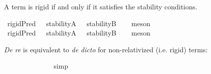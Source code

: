 \begin{isabellebody}
\begin{isamarkuptext}
A term is rigid if and only if it satisfies the stability conditions.%
\end{isamarkuptext}\isamarkuptrue%
\isamarkupfalse%
\ {\isachardoublequoteopen}{\isasymlfloor}rigidPred\ {\isacharparenleft}{\isasymtau}{\isacharcolon}{\isacharcolon}{\isasymup}{\isasymlangle}{\isasymzero}{\isasymrangle}{\isacharparenright}{\isasymrfloor}\ {\isasymlongleftrightarrow}\ {\isasymlfloor}{\isacharparenleft}stabilityA\ {\isasymtau}\ \isactrlbold {\isasymand}\ stabilityB\ {\isasymtau}{\isacharparenright}{\isasymrfloor}{\isachardoublequoteclose}%
\ %
%
\isamarkupfalse%
\ meson%
%
%
\ \ \ \isanewline
{}\isamarkupfalse%
\ {\isachardoublequoteopen}{\isasymlfloor}rigidPred\ {\isacharparenleft}{\isasymtau}{\isacharcolon}{\isacharcolon}{\isasymup}{\isasymlangle}{\isasymup}{\isasymzero}{\isasymrangle}{\isacharparenright}{\isasymrfloor}\ {\isasymlongleftrightarrow}\ {\isasymlfloor}{\isacharparenleft}stabilityA\ {\isasymtau}\ \isactrlbold {\isasymand}\ stabilityB\ {\isasymtau}{\isacharparenright}{\isasymrfloor}{\isachardoublequoteclose}%
\ %
%
\isamarkupfalse%
\ meson%
%
%
%
\begin{isamarkuptext}%
\emph{De re} is equivalent to \emph{de dicto} for non-relativized (i.e. rigid) terms:%
\end{isamarkuptext}\isamarkuptrue%
\isamarkupfalse%
\ {\isachardoublequoteopen}{\isasymlfloor}\isactrlbold {\isasymforall}{\isasymalpha}{\isachardot}\ {\isacharparenleft}{\isacharparenleft}{\isasymlambda}{\isasymbeta}{\isachardot}\ \isactrlbold {\isasymbox}{\isacharparenleft}{\isasymalpha}\ {\isasymbeta}{\isacharparenright}{\isacharparenright}\ {\isacharparenleft}{\isasymtau}{\isacharcolon}{\isacharcolon}{\isasymlangle}{\isasymzero}{\isasymrangle}{\isacharparenright}{\isacharparenright}\ \ \isactrlbold {\isasymleftrightarrow}\ \isactrlbold {\isasymbox}{\isacharparenleft}{\isacharparenleft}{\isasymlambda}{\isasymbeta}{\isachardot}\ {\isacharparenleft}{\isasymalpha}\ {\isasymbeta}{\isacharparenright}{\isacharparenright}\ {\isasymtau}{\isacharparenright}{\isasymrfloor}{\isachardoublequoteclose}%
\ %
%
\isamarkupfalse%
\ simp%
%
%
\isanewline
{}\isamarkupfalse%
\ {\isachardoublequoteopen}{\isasymlfloor}\isactrlbold {\isasymforall}{\isasymalpha}{\isachardot}\ {\isacharparenleft}{\isacharparenleft}{\isasymlambda}{\isasymbeta}{\isachardot}\ \isactrlbold {\isasymbox}{\isacharparenleft}{\isasymalpha}\ {\isasymbeta}{\isacharparenright}{\isacharparenright}\ {\isacharparenleft}{\isasymtau}{\isacharcolon}{\isacharcolon}{\isasymup}{\isasymlangle}{\isasymzero}{\isasymrangle}{\isacharparenright}{\isacharparenright}\ \isactrlbold {\isasymleftrightarrow}\ \isactrlbold {\isasymbox}{\isacharparenleft}{\isacharparenleft}{\isasymlambda}{\isasymbeta}{\isachardot}\ {\isacharparenleft}{\isasymalpha}\ {\isasymbeta}{\isacharparenright}{\isacharparenright}\ {\isasymtau}{\isacharparenright}{\isasymrfloor}{\isachardoublequoteclose}%

\end{isabellebody}
